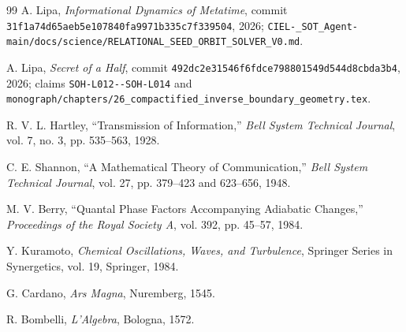 \documentclass[11pt]{article}
\newcommand{\codeid}[1]{\nolinkurl{#1}}
\begin{document}
\begin{thebibliography}{99}
A. Lipa, \emph{Informational Dynamics of Metatime}, commit
\codeid{31f1a74d65aeb5e107840fa9971b335c7f339504}, 2026;
\codeid{CIEL-_SOT_Agent-main/docs/science/RELATIONAL_SEED_ORBIT_SOLVER_V0.md}.

A. Lipa, \emph{Secret of a Half}, commit
\codeid{492dc2e31546f6fdce798801549d544d8cbda3b4}, 2026; claims
\codeid{SOH-L012--SOH-L014} and
\codeid{monograph/chapters/26_compactified_inverse_boundary_geometry.tex}.

R. V. L. Hartley, ``Transmission of Information,'' \emph{Bell System
Technical Journal}, vol. 7, no. 3, pp. 535--563, 1928.

C. E. Shannon, ``A Mathematical Theory of Communication,'' \emph{Bell System
Technical Journal}, vol. 27, pp. 379--423 and 623--656, 1948.

M. V. Berry, ``Quantal Phase Factors Accompanying Adiabatic Changes,''
\emph{Proceedings of the Royal Society A}, vol. 392, pp. 45--57, 1984.

Y. Kuramoto, \emph{Chemical Oscillations, Waves, and Turbulence}, Springer
Series in Synergetics, vol. 19, Springer, 1984.

G. Cardano, \emph{Ars Magna}, Nuremberg, 1545.

R. Bombelli, \emph{L'Algebra}, Bologna, 1572.

\end{thebibliography}
\end{document}
